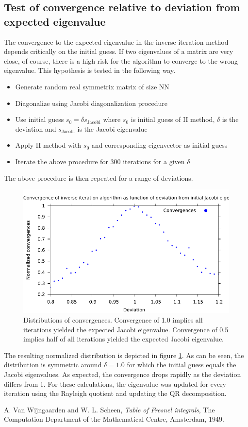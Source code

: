\documentclass{article}
\begin{document}
	\subsection*{Test of convergence relative to deviation from expected eigenvalue}
	The convergence to the expected eigenvalue in the inverse iteration method depends critically on the initial guess. If two eigenvalues of a matrix are very close, of course, there is a high risk for the algorithm to converge to the wrong eigenvalue. This hypothesis is tested in the following way.
	\begin{itemize}
		\item Generate random real symmetrix matrix of size NN
		\item Diagonalize using Jacobi diagonalization procedure
		\item Use initial guess $s_{0} = \delta s_{\textrm{Jacobi}}$ where $s_{0}$ is initial guess of II method, $\delta$ is the deviation and $s_{\textrm{Jacobi}}$ is the Jacobi eigenvalue
		\item Apply II method with $s_{0}$ and corresponding eigenvector as initial guess
		\item Iterate the above procedure for 300 iterations for a given $\delta$
	\end{itemize}
	The above procedure is then repeated for a range of deviations. 
	\begin{figure}
		\includegraphics[]{../outfiles/Deviations.pdf}
		\caption{Distributions of convergences. Convergence of 1.0 implies all iterations yielded the expected Jacobi eigenvalue. Convergence of 0.5 implies half of all iterations yielded the expected Jacobi eigenvalue.}
		\label{fig:deviations}
	\end{figure}	
	The resulting normalized distribution is depicted in figure \ref{fig:deviations}. As can be seen, the distribution is symmetric around $\delta = 1.0$ for which the initial guess equals the Jacobi eigenvalues. As expected, the convergence drops rapidly as the deviation differs from 1. For these calculations, the eigenvalue was updated for every iteration using the Rayleigh quotient and updating the QR decomposition.

\begin{thebibliography}{9}
	A. Van Wijngaarden and W. L. Scheen,
	\textit{Table of Fresnel integrals},
	The Computation Department of the Mathematical Centre, Amsterdam,
	1949.
\end{thebibliography}
\end{document}
